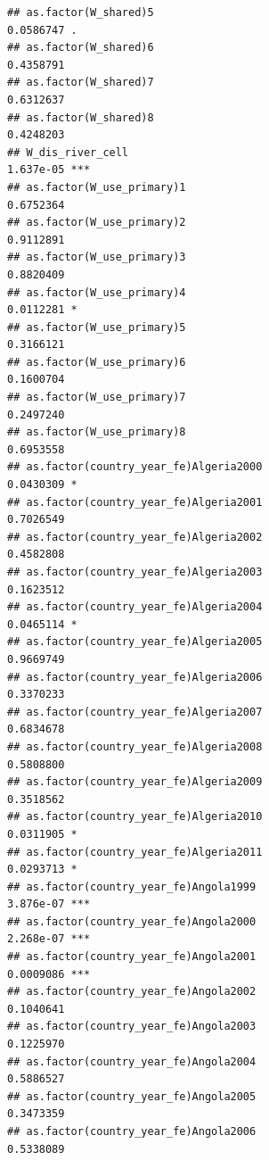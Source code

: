 \documentclass[
  a4paper,
]{article}
\begin{document}
\begin{verbatim}
## as.factor(W_shared)5                                           0.0586747 .  
## as.factor(W_shared)6                                           0.4358791    
## as.factor(W_shared)7                                           0.6312637    
## as.factor(W_shared)8                                           0.4248203    
## W_dis_river_cell                                               1.637e-05 ***
## as.factor(W_use_primary)1                                      0.6752364    
## as.factor(W_use_primary)2                                      0.9112891    
## as.factor(W_use_primary)3                                      0.8820409    
## as.factor(W_use_primary)4                                      0.0112281 *  
## as.factor(W_use_primary)5                                      0.3166121    
## as.factor(W_use_primary)6                                      0.1600704    
## as.factor(W_use_primary)7                                      0.2497240    
## as.factor(W_use_primary)8                                      0.6953558    
## as.factor(country_year_fe)Algeria2000                          0.0430309 *  
## as.factor(country_year_fe)Algeria2001                          0.7026549    
## as.factor(country_year_fe)Algeria2002                          0.4582808    
## as.factor(country_year_fe)Algeria2003                          0.1623512    
## as.factor(country_year_fe)Algeria2004                          0.0465114 *  
## as.factor(country_year_fe)Algeria2005                          0.9669749    
## as.factor(country_year_fe)Algeria2006                          0.3370233    
## as.factor(country_year_fe)Algeria2007                          0.6834678    
## as.factor(country_year_fe)Algeria2008                          0.5808800    
## as.factor(country_year_fe)Algeria2009                          0.3518562    
## as.factor(country_year_fe)Algeria2010                          0.0311905 *  
## as.factor(country_year_fe)Algeria2011                          0.0293713 *  
## as.factor(country_year_fe)Angola1999                           3.876e-07 ***
## as.factor(country_year_fe)Angola2000                           2.268e-07 ***
## as.factor(country_year_fe)Angola2001                           0.0009086 ***
## as.factor(country_year_fe)Angola2002                           0.1040641    
## as.factor(country_year_fe)Angola2003                           0.1225970    
## as.factor(country_year_fe)Angola2004                           0.5886527    
## as.factor(country_year_fe)Angola2005                           0.3473359    
## as.factor(country_year_fe)Angola2006                           0.5338089    

\end{verbatim}
\end{document}

